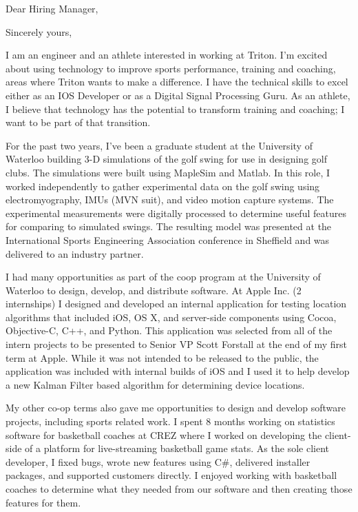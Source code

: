 \documentclass[11pt,a4paper,sans]{moderncv} %
\begin{document}
\clearpage

\date{\today} %
\opening{Dear Hiring Manager,} %
\closing{Sincerely yours,} %

\makelettertitle %

I am an engineer and an athlete interested in working at Triton. I'm excited about using technology to improve sports performance, training and coaching, areas where Triton wants to make a difference. I have the technical skills to excel either as an IOS Developer or as a Digital Signal Processing Guru. As an athlete, I believe that technology has the potential to transform training and coaching; I want to be part of that transition.

For the past two years, I've been a graduate student at the University of Waterloo building 3-D simulations of the golf swing for use in designing golf clubs. The simulations were built using MapleSim and Matlab. In this role, I worked independently to gather experimental data on the golf swing using electromyography, IMUs (MVN suit), and video motion capture systems. The experimental measurements were digitally processed to determine useful features for comparing to simulated swings.  The resulting model was presented at the International Sports Engineering Association conference in Sheffield and was delivered to an industry partner.

I had many opportunities as part of the coop program at the University of Waterloo to design, develop, and distribute software.  At Apple Inc. (2 internships) I designed and developed an internal application for testing location algorithms that included iOS, OS X, and server-side components using Cocoa, Objective-C, C++, and Python.  This application was selected from all of the intern projects to be presented to Senior VP Scott Forstall at the end of my first term at Apple. While it was not intended to be released to the public, the application was included with internal builds of iOS and I used it to help develop a new Kalman Filter based algorithm for determining device locations.

My other co-op terms also gave me opportunities to design and develop software projects, including sports related work.  I spent 8 months working on statistics software for basketball coaches at CREZ where I worked on developing the client-side of a platform for live-streaming basketball game stats. As the sole client developer, I fixed bugs, wrote new features using C\#, delivered installer packages, and supported customers directly. I enjoyed working with basketball coaches to determine what they needed from our software and then creating those features for them.
\end{document}
